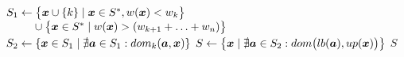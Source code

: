 \begin{algorithmic}[1]
    \State $S_1 \gets \big\{\boldsymbol{x} \cup \{k\} \;|\; \boldsymbol{x}
      \in S^*, w(\boldsymbol{x}) < w_k \big\}$
      \State $\phantom{S_1 \gets } \cup \big\{ \boldsymbol{x} \in S^* \; | \; w(\boldsymbol{x}) > (w_{k+1} + \ldots + w_n)\big\}$
    \State $S_2 \gets \{\boldsymbol{x} \in S_1 \;|\; \nexists \boldsymbol{a} \in S_1: dom_k(\boldsymbol{a}, \boldsymbol{x}) \}$
    \State $S \gets \big\{ \boldsymbol{x} \;|\; \nexists \boldsymbol{a} \in S_2 : dom\big(lb(\boldsymbol{a}), up(\boldsymbol{x})\big)\big\}$
  \State \Return $S$
  \EndFunction
\end{algorithmic}
